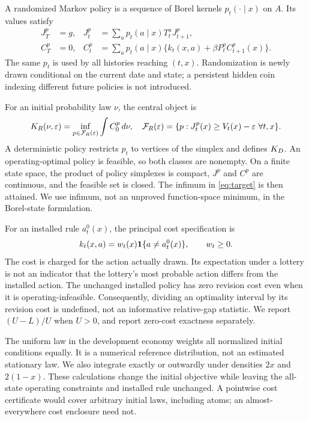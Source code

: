 A randomized Markov policy is a sequence of Borel kernels $p_t(\cdot\mid x)$ on $A$. Its values satisfy
\begin{align}
 J_T^p&=g,& J_t^p&=\sum_a p_t(a\mid x)T_t^aJ_{t+1}^p,\label{eq:operating}\\
 C_T^p&=0,& C_t^p&=\sum_a p_t(a\mid x)\{k_t(x,a)+\beta P_t^aC_{t+1}^p(x)\}.\label{eq:cost}
\end{align}
The same $p_t$ is used by all histories reaching $(t,x)$. Randomization is newly drawn conditional on the current date and state; a persistent hidden coin indexing different future policies is not introduced.

For an initial probability law $\nu$, the central object is
\begin{equation}\label{eq:target}
 K_R(\nu,\varepsilon)=\inf_{p\in\mathcal F_R(\varepsilon)}\int C_0^p\,d\nu,
 \quad
 \mathcal F_R(\varepsilon)=\{p:J_t^p(x)\geq V_t(x)-\varepsilon\ \forall t,x\}.
\end{equation}
A deterministic policy restricts $p_t$ to vertices of the simplex and defines $K_D$. An operating-optimal policy is feasible, so both classes are nonempty. On a finite state space, the product of policy simplexes is compact, $J^p$ and $C^p$ are continuous, and the feasible set is closed. The infimum in \eqref{eq:target} is then attained. We use infimum, not an unproved function-space minimum, in the Borel-state formulation.

For an installed rule $a_t^0(x)$, the principal cost specification is
\begin{equation}\label{eq:revisioncost}
 k_t(x,a)=w_t(x)\mathbf 1\{a\ne a_t^0(x)\},\qquad w_t\geq0.
\end{equation}
The cost is charged for the action actually drawn. Its expectation under a lottery is not an indicator that the lottery's most probable action differs from the installed action. The unchanged installed policy has zero revision cost even when it is operating-infeasible. Consequently, dividing an optimality interval by its revision cost is undefined, not an informative relative-gap statistic. We report $(U-L)/U$ when $U>0$, and report zero-cost exactness separately.

The uniform law in the development economy weights all normalized initial conditions equally. It is a numerical reference distribution, not an estimated stationary law. We also integrate exactly or outwardly under densities $2x$ and $2(1-x)$. These calculations change the initial objective while leaving the all-state operating constraints and installed rule unchanged. A pointwise cost certificate would cover arbitrary initial laws, including atoms; an almost-everywhere cost enclosure need not.

